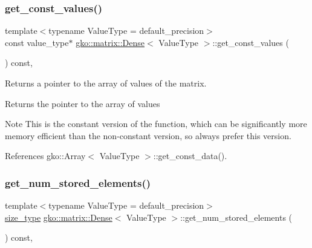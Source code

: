 \subsubsection{\texorpdfstring{get\+\_\+const\+\_\+values()}{get\_const\_values()}}
{\footnotesize\ttfamily template$<$typename Value\+Type = default\+\_\+precision$>$ \\
const value\+\_\+type$\ast$ \hyperlink{classgko_1_1matrix_1_1Dense}{gko\+::matrix\+::\+Dense}$<$ Value\+Type $>$\+::get\+\_\+const\+\_\+values (\begin{DoxyParamCaption}{ }\end{DoxyParamCaption}) const\hspace{0.3cm}{\ttfamily [inline]}, {\ttfamily [noexcept]}}



Returns a pointer to the array of values of the matrix. 

\begin{DoxyReturn}{Returns}
the pointer to the array of values
\end{DoxyReturn}
\begin{DoxyNote}{Note}
This is the constant version of the function, which can be significantly more memory efficient than the non-\/constant version, so always prefer this version. 
\end{DoxyNote}


References gko\+::\+Array$<$ Value\+Type $>$\+::get\+\_\+const\+\_\+data().

\mbox{\label{classgko_1_1matrix_1_1Dense_a7a6ce578c683841591718134e1ccd1b9}} 
\subsubsection{\texorpdfstring{get\+\_\+num\+\_\+stored\+\_\+elements()}{get\_num\_stored\_elements()}}
{\footnotesize\ttfamily template$<$typename Value\+Type = default\+\_\+precision$>$ \\
\hyperlink{namespacegko_a6e5c95df0ae4e47aab2f604a22d98ee7}{size\+\_\+type} \hyperlink{classgko_1_1matrix_1_1Dense}{gko\+::matrix\+::\+Dense}$<$ Value\+Type $>$\+::get\+\_\+num\+\_\+stored\+\_\+elements (\begin{DoxyParamCaption}{ }\end{DoxyParamCaption}) const\hspace{0.3cm}{\ttfamily [inline]}, {\ttfamily [noexcept]}}



